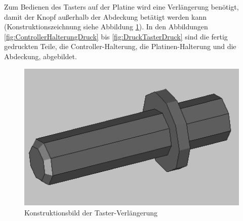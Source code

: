 \begin{minipage}[t]{0.54\textwidth}
\indent Zum Bedienen des Tasters auf der Platine wird eine Verlängerung benötigt, damit der Knopf außerhalb der Abdeckung betätigt werden kann (Konstruktionszeichnung siehe Abbildung \ref{fig:DruckTasterKonstruktion}). In den Abbildungen \ref{fig:ControllerHalterungDruck} bis \ref{fig:DruckTasterDruck} sind die fertig gedruckten Teile, die Controller-Halterung, die Platinen-Halterung und die Abdeckung, abgebildet.
\end{minipage}
\begin{minipage}[t]{0.4\textwidth}
\vspace{-7mm}
\begin{figure}[H] %
\includegraphics[width=.7\textwidth]{sec2/images/3DAnbaukomponenten/Konstruktionsbilder/DruckTasterKonstruktion} 
\centering
\captionsetup{width=.9\textwidth}
\caption[Konstruktionsbild der Taster-Verlängerung]{Konstruktionsbild der Taster-Verlängerung}
\centering
\label{fig:DruckTasterKonstruktion}
\end{figure}
\end{minipage}

